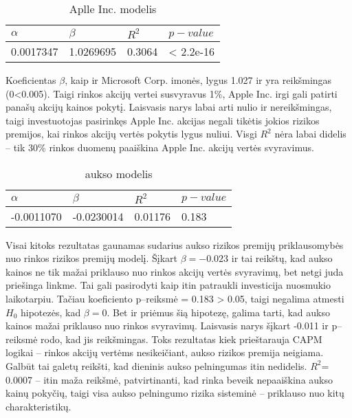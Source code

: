 \documentclass[12pt, a14paper, lithuanian]{article}
\begin{document}
\begin{table}[ht]
\begin{center}
    \begin{tabular}{ | l | l | l | l | }
    \hline
    $ \alpha $ & $ \beta $ & $ R^2 $ & $ p-value $  \\
    \hline
	0.0017347 & 1.0269695 & 0.3064 & < 2.2e-16\\
	\hline
    \end{tabular}
\end{center}
\caption{Aplle Inc. modelis}
\end{table}

Koeficientas $\beta$, kaip ir Microsoft Corp. imonės, lygus 1.027 ir yra reikšmingas (0<0.005). Taigi rinkos akcijų vertei susvyravus 1\%, Apple
Inc. irgi gali patirti panašų akcijų kainos pokytį. Laisvasis narys labai arti nulio ir nereikšmingas,
taigi investuotojas pasirinkęs Apple Inc. akcijas negali tikėtis jokios rizikos premijos, kai rinkos akcijų vertės
pokytis lygus nuliui.
Visgi  $R^2$ nėra labai didelis -- tik 30\% rinkos duomenų paaiškina Apple Inc. akcijų vertės svyravimus.

\begin{table}[ht]
\begin{center}
    \begin{tabular}{ | l | l | l | l | }
    \hline
    $ \alpha $ & $ \beta $ & $ R^2 $ & $ p-value $  \\
    \hline
	-0.0011070 & -0.0230014 & 0.01176 &  0.183\\
	\hline
    \end{tabular}
\end{center}
\caption{aukso modelis}
\end{table}

Visai kitoks rezultatas gaunamas sudarius aukso rizikos premijų priklausomybės nuo rinkos rizikos premijų modelį.
Šįkart $\beta=-0.023$ ir tai reikštų, kad aukso kainos ne tik mažai priklauso nuo rinkos akcijų vertės svyravimų,
bet netgi juda priešinga linkme. Tai gali pasirodyti kaip itin patraukli investicija nuosmukio laikotarpiu.
Tačiau koeficiento p--reiksmė = 0.183 > 0.05, taigi negalima atmesti $ H_0 $ hipotezės, kad $\beta=0 $. Bet ir
priėmus šią hipotezę, galima tarti, kad aukso kainos mažai priklauso nuo rinkos svyravimų.
Laisvasis narys šįkart -0.011 ir p--reiksmė rodo, kad jis reikšmingas. Toks rezultatas kiek prieštarauja CAPM logikai -- rinkos akcijų vertėms nesikeičiant, aukso rizikos premija neigiama. Galbūt tai galetų reikšti,
kad dieninis aukso pelningumas itin nedidelis.
$ R^2 $= 0.0007 -- itin maža reikšmė, patvirtinanti, kad rinka beveik nepaaiškina aukso kainų pokyčių, taigi 
visa aukso pelningumo rizika sisteminė -- priklauso nuo kitų charakteristikų.
\end{document}
